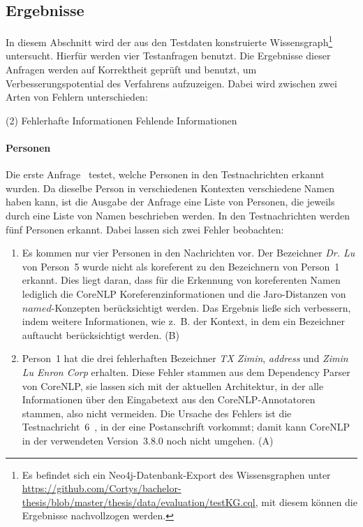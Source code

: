 \subsection{Ergebnisse}%
\label{sec:evaluation:quality:results}

In diesem Abschnitt wird der aus den Testdaten konstruierte Wissensgraph\footnote{Es befindet sich ein Neo4j-Datenbank-Export des Wissensgraphen unter \url{https://github.com/Cortys/bachelor-thesis/blob/master/thesis/data/evaluation/testKG.cql}, mit diesem können die Ergebnisse nachvollzogen werden.} untersucht.
Hierfür werden vier Testanfragen benutzt.
Die Ergebnisse dieser Anfragen werden auf Korrektheit geprüft und benutzt, um Verbesserungspotential des Verfahrens aufzuzeigen.
Dabei wird zwischen zwei Arten von Fehlern unterschieden:
\newcommand{\errorA}{{\color{rot} (A)}}
\newcommand{\errorB}{{\color{blau} (B)}}
\begin{tasks}[label-offset=1em](2) %
	\task[\errorA] \color{rot}Fehlerhafte Informationen
	\task[\errorB] \color{blau}Fehlende Informationen
\end{tasks}

\paragraph{Personen}
Die erste Anfrage~ testet, welche Personen in den Testnachrichten erkannt wurden.
Da dieselbe Person in verschiedenen Kontexten verschiedene Namen haben kann, ist die Ausgabe der Anfrage eine Liste von Personen, die jeweils durch eine Liste von Namen beschrieben werden.
In den Testnachrichten werden fünf Personen erkannt.
Dabei lassen sich zwei Fehler beobachten:
\begin{enumerate}
	\item Es kommen nur vier Personen in den Nachrichten vor.
		Der Bezeichner \textit{Dr. Lu} von Person~5 wurde nicht als koreferent zu den Bezeichnern von Person~1 erkannt. %
		Dies liegt daran, dass für die Erkennung von koreferenten Namen lediglich die CoreNLP Koreferenzinformationen und die Jaro-Distanzen von $named$-Konzepten berücksichtigt werden.
		Das Ergebnis ließe sich verbessern, indem weitere Informationen, wie z.~B. der Kontext, in dem ein Bezeichner auftaucht berücksichtigt werden. \errorB\
	\item Person~1 hat die drei fehlerhaften Bezeichner \textit{TX Zimin}, \textit{address} und \textit{Zimin Lu Enron Corp} erhalten.
		Diese Fehler stammen aus dem Dependency Parser von CoreNLP, sie lassen sich mit der aktuellen Architektur, in der alle Informationen über den Eingabetext aus den CoreNLP-Annotatoren stammen, also nicht vermeiden.
		Die Ursache des Fehlers ist die Testnachricht~6~\tref{sec:appendix:msgs}, in der eine Postanschrift vorkommt;
		damit kann CoreNLP in der verwendeten Version~3.8.0 noch nicht umgehen. \errorA\
\end{enumerate}


